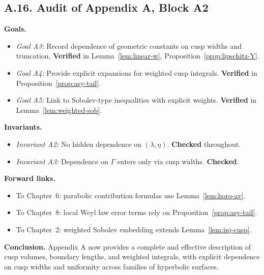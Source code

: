 \subsection*{A.16. Audit of Appendix A, Block A2}

\noindent
\textbf{Goals.}
\begin{itemize}
  \item \emph{Goal A3:} Record dependence of geometric constants on cusp widths and truncation.  
  \textbf{Verified} in Lemma~\ref{lem:linear-w}, Proposition~\ref{prop:lipschitz-Y}.
  \item \emph{Goal A4:} Provide explicit expansions for weighted cusp integrals.  
  \textbf{Verified} in Proposition~\ref{prop:asy-tail}.
  \item \emph{Goal A5:} Link to Sobolev-type inequalities with explicit weights.  
  \textbf{Verified} in Lemma~\ref{lem:weighted-sob}.
\end{itemize}

\noindent
\textbf{Invariants.}
\begin{itemize}
  \item \emph{Invariant A2:} No hidden dependence on $(\lambda,\eta)$.  
  \textbf{Checked} throughout.
  \item \emph{Invariant A3:} Dependence on $\Gamma$ enters only via cusp widths.  
  \textbf{Checked}.
\end{itemize}

\noindent
\textbf{Forward links.}
\begin{itemize}
  \item To Chapter~6: parabolic contribution formulas use Lemma~\ref{lem:horo-av}.  
  \item To Chapter~8: local Weyl law error terms rely on Proposition~\ref{prop:asy-tail}.  
  \item To Chapter~2: weighted Sobolev embedding extends Lemma~\ref{lem:inj-cusp}.  
\end{itemize}

\bigskip
\noindent
\textbf{Conclusion.}
Appendix A now provides a complete and effective description of cusp volumes,
boundary lengths, and weighted integrals, with explicit dependence on cusp widths
and uniformity across families of hyperbolic surfaces.

